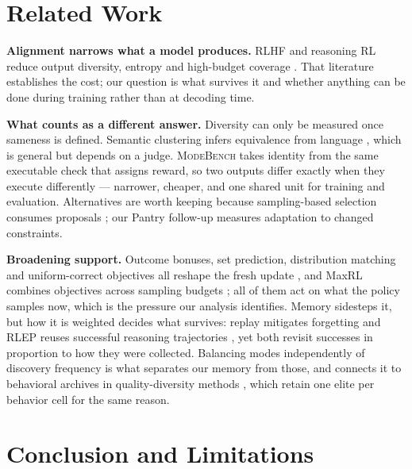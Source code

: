 \documentclass{article}
\newcommand{\1}{\mathbf 1}
\newcommand{\mb}{\textsc{ModeBench}}
\theoremstyle{remark}
\theoremstyle{definition}
\theoremstyle{plain}
\begin{document}
\section{Related Work}
\label{sec:related}

\textbf{Alignment narrows what a model produces.} RLHF and reasoning RL reduce
output diversity, entropy and high-budget coverage
\citep{kirk2024understanding,dang2025diversity,cui2025entropy,yue2025rlvrlimit}.
That literature establishes the cost; our question is what survives it and
whether anything can be done during training rather than at decoding time.

\textbf{What counts as a different answer.} Diversity can only be measured once
sameness is defined. Semantic clustering infers equivalence from language
\citep{farquhar2024detecting}, which is general but depends on a judge. \mb{}
takes identity from the same executable check that assigns reward, so two
outputs differ exactly when they execute differently --- narrower, cheaper, and
one shared unit for training and evaluation. Alternatives are worth keeping
because sampling-based selection consumes proposals
\citep{brown2024monkeys,snell2024testtime,cobbe2021training,lightman2023lets};
our Pantry follow-up measures adaptation to changed constraints.

\textbf{Broadening support.} Outcome bonuses, set prediction, distribution
matching and uniform-correct objectives all reshape the fresh update
\citep{song2025outcome,chen2025passktraining,li2025divergence,li2026setpo,li2026distribution,lochab2026ucpo},
and MaxRL combines objectives across sampling budgets \citep{tajwar2026maxrl};
all of them act on what the policy samples now, which is the pressure our
analysis identifies. Memory sidesteps it, but how it is weighted decides what
survives: replay mitigates forgetting
\citep{lin1992selfimproving,rolnick2019replay} and RLEP reuses successful
reasoning trajectories \citep{zhang2025rlep}, yet both revisit successes in
proportion to how they were collected. Balancing modes independently of
discovery frequency is what separates our memory from those, and connects it to
behavioral archives in quality-diversity methods
\citep{mouret2015illuminating,ecoffet2021return}, which retain one elite per
behavior cell for the same reason.

\section{Conclusion and Limitations}
\label{sec:conclusion}
\label{sec:discussion}
\label{sec:limitations}
\end{document}
